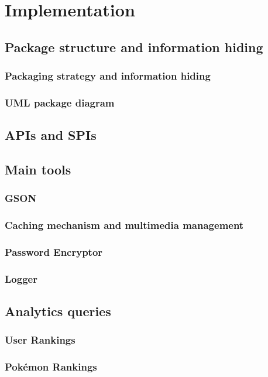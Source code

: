 \section{Implementation}
\subsection{Package structure and information hiding}
\subsubsection{Packaging strategy and information hiding}
\subsubsection{UML package diagram}


\subsection{APIs and SPIs}

\subsection{Main tools}
\subsubsection{GSON}
\subsubsection{Caching mechanism and multimedia management}
\subsubsection{Password Encryptor}
\subsubsection{Logger}

\subsection{Analytics queries}
\subsubsection{User Rankings}
\subsubsection{Pokémon Rankings}
